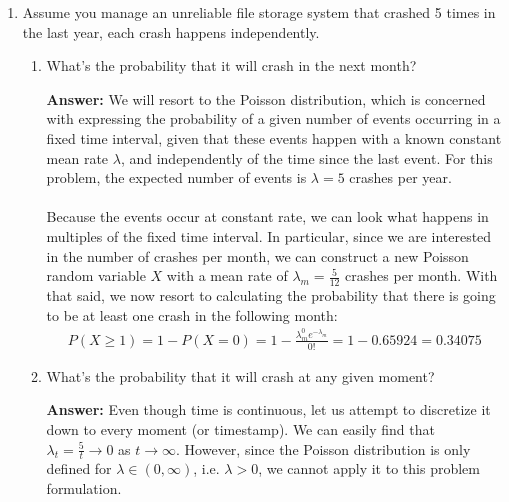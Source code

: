 \documentclass{article}
\newenvironment{QandA}{\begin{enumerate}[label=\arabic*.]}{\end{enumerate}}
\newenvironment{InnerQandA}{\begin{enumerate}[label=\roman*.]}{\end{enumerate}}
\newenvironment{answer}{\par\normalfont \textbf{Answer:}}{}
\begin{document}
\begin{QandA}
    \item Assume you manage an unreliable file storage system that crashed 5 times in the last year, each crash happens independently.
    \begin{InnerQandA}
        \item What's the probability that it will crash in the next month?
        \begin{answer}
            We will resort to the Poisson distribution, which is concerned with expressing the probability of a given number of events occurring in a fixed time interval, given that these events happen with a known constant mean rate $\lambda$, and independently of the time since the last event. For this problem, the expected number of events is $\lambda=5$ crashes per year. \\\\
            Because the events occur at constant rate, we can look what happens in multiples of the fixed time interval. In particular, since we are interested in the number of crashes per month, we can construct a new Poisson random variable $X$ with a mean rate of $\lambda_m = \frac{5}{12}$ crashes per month. With that said, we now resort to calculating the probability that there is going to be at least one crash in the following month:
            \begin{align*}
                P(X \ge 1) = 1 - P(X=0) = 1 - \frac{\lambda_m^0e^{-\lambda_m}}{0!} = 1 - 0.65924 = 0.34075
            \end{align*}
        \end{answer}

        \item What's the probability that it will crash at any given moment?
        \begin{answer}
              Even though time is continuous, let us attempt to discretize it down to every moment (or timestamp). We can easily find that $\lambda_t = \frac{5}{t} \rightarrow 0$ as $t \rightarrow \infty$. However, since the Poisson distribution is only defined for $\lambda \in (0, \infty)$, i.e. $\lambda > 0$, we cannot apply it to this problem formulation. 
        \end{answer}
    \end{InnerQandA}
    

\end{QandA}
\end{document}
